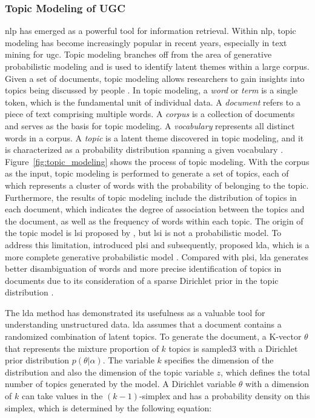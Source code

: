 \documentclass{article}
\begin{document}
\subsubsection{Topic Modeling of UGC}
\acrfull{nlp} has emerged as a powerful tool for information retrieval. Within \acrshort{nlp}, topic modeling has become increasingly popular in recent years, especially in text mining for \acrshort{ugc}. Topic modeling branches off from the area of generative probabilistic modeling and is used to identify latent themes within a large corpus. Given a set of documents,  topic modeling allows researchers to gain insights into topics being discussed by people \citep{sui_inferring_2013}. In topic modeling, a \textit{word} or \textit{term} is a single token, which is the fundamental unit of individual data. A \textit{document} refers to a piece of text comprising multiple words. A \textit{corpus} is a collection of documents and serves as the basis for topic modeling. A \textit{vocabulary} represents all distinct words in a corpus. A \textit{topic} is a latent theme discovered in topic modeling, and it is characterized as a probability distribution spanning a given vocabulary \citep{vayansky_review_2020}. Figure~\ref{fig:topic_modeling} shows the process of topic modeling. With the corpus as the input, topic modeling is performed to generate a set of topics, each of which represents a cluster of words with the probability of belonging to the topic. Furthermore, the results of topic modeling include the distribution of topics in each document, which indicates the degree of association between the topics and the document, as well as the frequency of words within each topic. The origin of the topic model is \acrfull{lsi} proposed by \cite{papadimitriou_latent_2000}, but \acrshort{lsi} is not a probabilistic model. To address this limitation, \cite{hofmann_unsupervised_2001} introduced \acrfull{plsi} and subsequently, \cite{blei_latent_2003} proposed \acrfull{lda}, which is a more complete generative probabilistic model \citep{liu_overview_2016}. Compared with \acrshort{plsi}, \acrshort{lda} generates better disambiguation of words and more precise identification of topics in documents due to its consideration of a sparse Dirichlet prior in the topic distribution \citep{barde_overview_2017}.

The \acrshort{lda} method has demonstrated its usefulness as a valuable tool for understanding unstructured data. \acrshort{lda} assumes that a document contains a randomized combination of latent topics. To generate the document, a K-vector \(\theta\) that represents the mixture proportion of \(k\) topics is sampled3 with a Dirichlet prior distribution \(p(\theta|\alpha)\). The variable \(k\) specifies the dimension of the distribution and also the dimension of the topic variable \(z\), which defines the total number of topics generated by the model. A Dirichlet variable \(\theta\) with a dimension of \(k\) can take values in the \((k-1)\)-simplex and has a probability density on this simplex, which is determined by the following equation:
\end{document}

